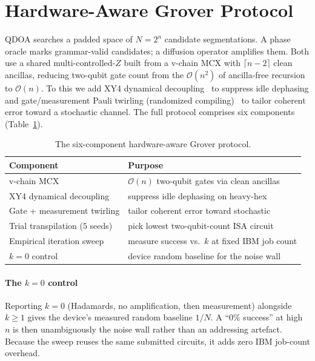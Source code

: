 \documentclass[journal]{IEEEtran}
\newcommand{\bigO}{\mathcal{O}}
\begin{document}
\section{Hardware-Aware Grover Protocol}
\label{sec:protocol}
QDOA searches a padded space of $N=2^{n}$ candidate segmentations. A phase
oracle marks grammar-valid candidates; a diffusion operator amplifies them.
Both use a shared multi-controlled-$Z$ built from a v-chain MCX with
$\lceil n\!-\!2\rceil$ clean ancillas, reducing two-qubit gate count from the
$\bigO(n^{2})$ of ancilla-free recursion to $\bigO(n)$. To this we add XY4
dynamical decoupling~\cite{viola1999} to suppress idle dephasing and
gate/measurement Pauli twirling (randomized compiling)~\cite{wallman2016} to
tailor coherent error toward a stochastic channel. The full protocol
comprises six components (Table~\ref{tab:protocol}).

\begin{table}[t]
\centering
\caption{The six-component hardware-aware Grover protocol.}
\label{tab:protocol}
\small
\begin{tabular}{@{}p{2.5cm}p{5.3cm}@{}}
\toprule
Component & Purpose \\
\midrule
v-chain MCX & $\bigO(n)$ two-qubit gates via clean ancillas \\
XY4 dynamical decoupling & suppress idle dephasing on heavy-hex \\
Gate + measurement twirling & tailor coherent error toward stochastic \\
Trial transpilation ($5$ seeds) & pick lowest two-qubit-count ISA circuit \\
Empirical iteration sweep & measure success vs.\ $k$ at fixed IBM job count \\
$k{=}0$ control & device random baseline for the noise wall \\
\bottomrule
\end{tabular}
\end{table}

\paragraph{The $k{=}0$ control}
Reporting $k{=}0$ (Hadamards, no amplification, then measurement) alongside
$k\!\ge\!1$ gives the device's measured random baseline $1/N$. A ``0\% success''
at high $n$ is then unambiguously the noise wall rather than an addressing
artefact. Because the sweep reuses the same submitted circuits, it adds zero
IBM job-count overhead.
\end{document}
